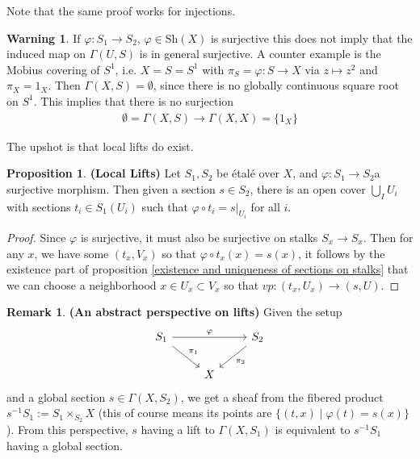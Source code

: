 \documentclass[10.5pt]{article}
\theoremstyle{definition}
\newtheorem{proposition}{Proposition}
\newtheorem{rmk}{Remark}
\newtheorem*{warn}{Warning \warning}
\newcommand{\set}[1]{\{#1\}}
\begin{document}
    Note that the same proof works for injections.

    \begin{warn}
        If \(\varphi: S_1 \to S_2\), \(\varphi \in \text{Sh}(X)\) is surjective this does not imply that the induced map on \(\Gamma(U,S)\) is in general surjective. A counter example is the Mobius covering of \(S^1\), i.e. \(X = S = S^1\) with \(\pi_S = \varphi: S \to X\) via \(z \mapsto z^2\) and \(\pi_X = 1_X\). Then \(\Gamma(X,S) = \emptyset\), since there is no globally continuous square root on \(S^1\). This implies that there is no surjection
        \begin{align*}
            \emptyset = \Gamma(X,S) \to \Gamma(X,X) = \set{1_X}
        \end{align*}
    \end{warn}
    The upshot is that local lifts do exist.

    \begin{proposition}\textbf{(Local Lifts)}
        Let \(S_1,S_2\) be \'etal\'e over \(X\), and \(\varphi: S_1 \to S_2\)a surjective morphism. Then given a section \(s \in S_2\), there is an open cover \(\bigcup_I U_i\) with sections \(t_i \in S_1(U_i)\) such that \(\varphi\circ t_i = s\vert_{U_i}\) for all \(i\).
    \end{proposition}
    \begin{proof}
        Since \(\varphi\) is surjective, it must also be surjective on stalks \(S_x \to S_x\). Then for any \(x\), we have some \((t_x,V_x)\) so that \(\varphi \circ t_x(x) = s(x)\), it follows by the existence part of proposition \ref{existence and uniqueness of sections on stalks} that we can choose a neighborhood \(x \in U_x \subset V_x\) so that \(vp: (t_x,U_x) \to (s,U)\).
    \end{proof}
    \begin{rmk}
        \textbf{(An abstract perspective on lifts)} Given the setup
        \begin{equation*}
            \begin{tikzcd}
                S_1 \arrow[rd,"{\pi_1}"] \arrow[rr,"{\varphi}"] &&S_2 \arrow[ld,"{\pi_2}"] \\
                &X
            \end{tikzcd}
        \end{equation*}
        and a global section \(s \in \Gamma(X,S_2)\), we get a sheaf from the fibered product \(s^{-1}S_1 := S_1 \times_{S_2}X\) (this of course means its points are \(\set{(t,x) \mid \varphi(t) = s(x)}\)). From this perspective, \(s\) having a lift to \(\Gamma(X,S_1)\) is equivalent to \(s^{-1}S_1\) having a global section.
    \end{rmk}
\end{document}
